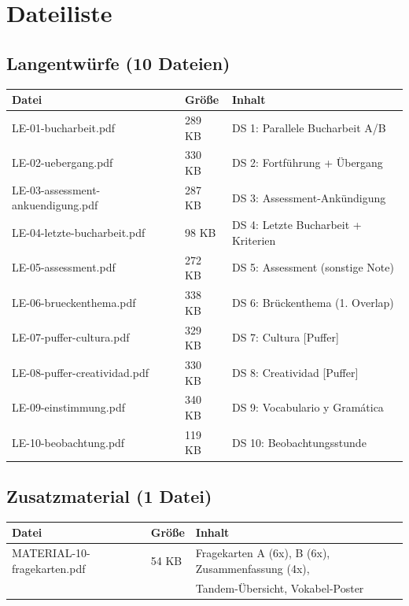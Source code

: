 \documentclass[11pt, a4paper]{article}
\begin{document}
\newpage


\section*{Dateiliste}

\subsection*{Langentwürfe (10 Dateien)}

\begin{tabular}{lll}
\toprule
\textbf{Datei} & \textbf{Größe} & \textbf{Inhalt} \\
\midrule
LE-01-bucharbeit.pdf & 289 KB & DS 1: Parallele Bucharbeit A/B \\
LE-02-uebergang.pdf & 330 KB & DS 2: Fortführung + Übergang \\
LE-03-assessment-ankuendigung.pdf & 287 KB & DS 3: Assessment-Ankündigung \\
LE-04-letzte-bucharbeit.pdf & 98 KB & DS 4: Letzte Bucharbeit + Kriterien \\
LE-05-assessment.pdf & 272 KB & DS 5: Assessment (sonstige Note) \\
LE-06-brueckenthema.pdf & 338 KB & DS 6: Brückenthema (1. Overlap) \\
LE-07-puffer-cultura.pdf & 329 KB & DS 7: Cultura [Puffer] \\
LE-08-puffer-creatividad.pdf & 330 KB & DS 8: Creatividad [Puffer] \\
LE-09-einstimmung.pdf & 340 KB & DS 9: Vocabulario y Gramática \\
LE-10-beobachtung.pdf & 119 KB & DS 10: Beobachtungsstunde \\
\bottomrule
\end{tabular}

\vspace{1cm}

\subsection*{Zusatzmaterial (1 Datei)}

\begin{tabular}{lll}
\toprule
\textbf{Datei} & \textbf{Größe} & \textbf{Inhalt} \\
\midrule
MATERIAL-10-fragekarten.pdf & 54 KB & Fragekarten A (6x), B (6x), Zusammenfassung (4x), \\
 & & Tandem-Übersicht, Vokabel-Poster \\
\bottomrule
\end{tabular}
\end{document}
